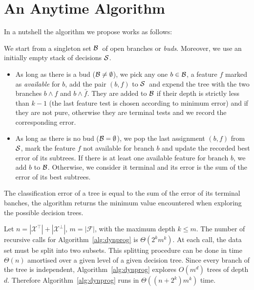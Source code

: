 \documentclass{article}
\newcommand{\setex}[1]{\ensuremath{{\mathcal X}^{#1}}\xspace}
\newcommand{\posex}{{\setex{\top}}\xspace}
\newcommand{\negex}{{\setex{\bot}}\xspace}
\newcommand{\features}{\ensuremath{{\mathcal F}}\xspace}
\newcommand{\nodes}[0]{\ensuremath{{\cal N}}}
\newcommand{\bud}[0]{\ensuremath{{\cal B}}}
\newcommand{\sequence}[0]{\ensuremath{{\cal S}}}
\newcommand{\maxd}[0]{\ensuremath{k}}
\newcommand{\afeat}[0]{\ensuremath{f}}
\newcommand{\abranch}[0]{\ensuremath{b}}
\begin{document}
\section*{An Anytime Algorithm}

In a nutshell the algorithm we propose works as follows:

\medskip

We start from a singleton set \bud\ of open branches or \emph{buds}.
Moreover, we use an initially empty stack of decisions $\sequence$.

\begin{itemize}
	\item As long as there is a bud ($\bud \neq \emptyset$), we pick any one $\abranch \in \bud$, a feature $\afeat$ marked as \emph{available} for \abranch, add the pair $(\abranch,\afeat)$ to \sequence\ and expend the tree with the two branches $\abranch \wedge \afeat$ and $\abranch \wedge \bar{\afeat}$. 
	They are added to $\bud$ if their depth is strictly less than $\maxd-1$ (the last feature test is chosen according to minimum error) and if they are not pure, otherwise they are terminal tests and we record the corresponding error.

\item As long as there is no bud ($\bud = \emptyset$), we pop the last assignment $(\abranch,\afeat)$ from \sequence, mark the feature $\afeat$ not available for branch $\abranch$ and update the recorded best error of its subtrees. If there is at least one available feature for branch $\abranch$, we add $\abranch$ to $\bud$. 
Otherwise, we consider it terminal and its error is the sum of the error of its best subtrees.

\end{itemize}

The classification error of a tree is equal to the sum of the error of its terminal banches, the algorithm returns the minimum value encountered when exploring the possible decision trees.

\medskip
		
		Let $n = |\posex| + |\negex|$, $m = |\features|$, with the maximum depth $k \leq m$. 
		The number of recursive calls for Algorithm~\ref{alg:dynprog} is $\Theta(2^km^k)$. At each call, the data set must be split into two subsets. This splitting procedure can be done in time $\Theta(n)$ amortised over a given level of a given decision tree. Since every branch of the tree is independent, Algorithm~\ref{alg:dynprog} explores $O(m^d)$ trees of depth $d$. Therefore Algorithm~\ref{alg:dynprog} runs in $\Theta((n+2^k)m^k)$ time.
		
\end{document}
